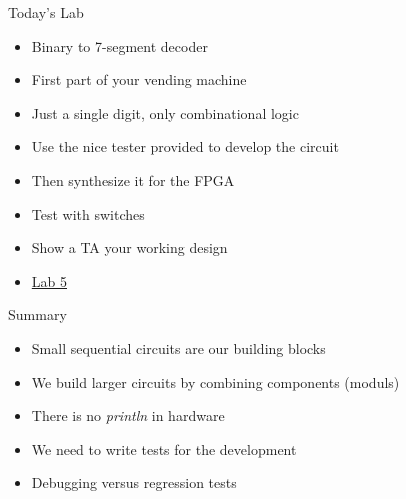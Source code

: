 \begin{frame}[fragile]{Today's Lab}
\begin{itemize}
\item Binary to 7-segment decoder
\item First part of your vending machine
\item Just a single digit, only combinational logic
\item Use the nice tester provided to develop the circuit
\item Then synthesize it for the FPGA
\item Test with switches
\item Show a TA your working design
\item \href{https://github.com/schoeberl/chisel-lab/tree/master/lab5}{Lab 5}
\end{itemize}
\end{frame}

\begin{frame}[fragile]{Summary}
\begin{itemize}
\item Small sequential circuits are our building blocks
\item We build larger circuits by combining components (moduls)
\item There is no \emph{println} in hardware
\item We need to write tests for the development
\item Debugging versus regression tests
\end{itemize}
\end{frame}




